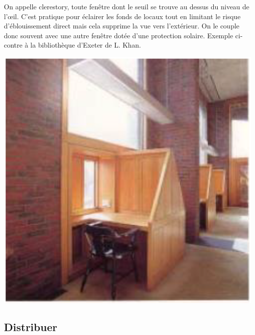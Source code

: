 \documentclass[11pt]{report}
\begin{document}
\begin{minipage}{0.7\linewidth}
On appelle clerestory, toute fenêtre dont le seuil se trouve au dessus du niveau de l'œil. C'est pratique pour éclairer les fonds de locaux tout en limitant le risque d'éblouissement direct mais cela supprime la vue vers l'extérieur. On le couple donc souvent avec une autre fenêtre dotée d'une protection solaire. Exemple ci-contre à la bibliothèque d'Exeter de L. Khan.
\end{minipage}
\begin{minipage}{0.3\linewidth}
\centering
\includegraphics[scale=0.25]{bibli}
\end{minipage}




















\subsection{Distribuer}
\\
\end{document}
